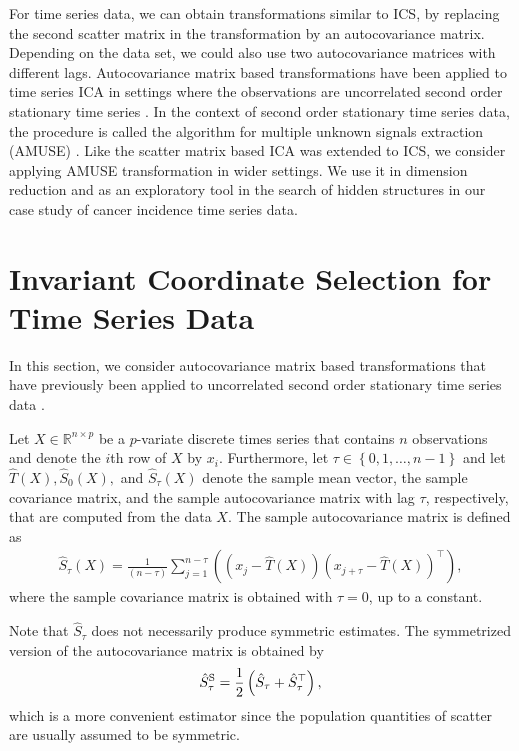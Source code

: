 \documentclass{llncs}
\begin{document}
For time series data, we can obtain transformations similar to ICS, by replacing the second scatter matrix in the transformation by an  autocovariance matrix.  Depending on the data set, we could also use two autocovariance matrices with different lags.  Autocovariance 
matrix based transformations have been applied to time series ICA in settings where the observations are
uncorrelated second order stationary time series \cite{Miettinen2012,Tong1990}.  In the context of second order stationary time series data, the procedure is called the algorithm for multiple unknown signals extraction (AMUSE) \cite{Tong1990}. Like the
scatter matrix based ICA was extended to ICS, we consider applying
AMUSE transformation in  wider settings.
We use it in dimension reduction and as an exploratory
tool in the search of hidden structures in our case study of cancer incidence time
series data. 

\section{Invariant Coordinate Selection for Time Series Data}\label{tics}
In this section, we consider autocovariance matrix based transformations that have previously been applied to uncorrelated second order stationary time series data \cite{Miettinen2012,Tong1990}.


Let $X\in \mathbb{R}^{n\times p}$ be a $p$-variate discrete times series that contains $n$ observations and denote the $i$th row of $X$ by $x_i$. Furthermore, let $\tau \in \left\{0,1,\ldots,n-1\right\}$ and let $\hat{T}\left(X\right), \hat{S}_0\left(X\right),$ and $\hat{S}_{\tau}\left(X\right)$ denote the sample mean vector, the sample covariance matrix, and the sample autocovariance matrix with lag $\tau$, respectively, that are computed from the data $X.$ The sample autocovariance matrix is defined as 
\begin{align*}
\hat{S}_{\tau}\left(X\right)=\frac{1}{\left(n -\tau\right)} \sum^{n-\tau}_{j=1}\left(\left(x_j - \hat{T}\left(X\right)\right)\left(x_{j+\tau} - \hat{T}\left(X\right)\right)^\top \right),
\end{align*}
where the sample covariance matrix is obtained with $\tau=0$, up to a constant. 

Note that $\hat{S}_\tau$ does not necessarily produce symmetric estimates. The symmetrized version of the autocovariance matrix is obtained by
\begin{align*}
\hat{S}_\tau^\textnormal{S} = \frac{1}{2} \left( \hat{S}_\tau + \hat{S}^\top_\tau \right),
\end{align*}
which is a more convenient estimator since the population quantities of scatter are usually assumed to be symmetric.
\end{document}
